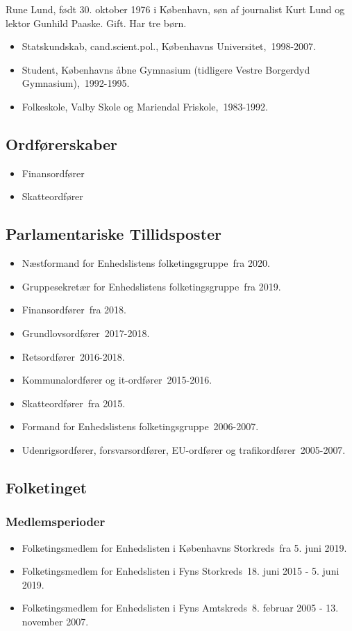 \documentclass[11pt, a4paper]{awesome-cv}
\begin{document}
\makecvheader[R]
\makelettertitle
\begin{cvletter}
Rune Lund, født 30. oktober 1976 i København, søn af journalist Kurt Lund og lektor Gunhild Paaske. Gift. Har tre børn.

\begin{itemize}
\item Statskundskab, cand.scient.pol., Københavns Universitet, 1998-2007.
\item Student, Københavns åbne Gymnasium (tidligere Vestre Borgerdyd Gymnasium), 1992-1995.
\item Folkeskole, Valby Skole og Mariendal Friskole, 1983-1992.
\end{itemize}
\subsection*{Ordførerskaber}
\begin{itemize}
\item Finansordfører
\item Skatteordfører
\end{itemize}
\subsection*{Parlamentariske Tillidsposter}
\begin{itemize}
\item Næstformand for Enhedslistens folketingsgruppe fra 2020.
\item Gruppesekretær for Enhedslistens folketingsgruppe fra 2019.
\item Finansordfører fra 2018.
\item Grundlovsordfører 2017-2018.
\item Retsordfører 2016-2018.
\item Kommunalordfører og it-ordfører 2015-2016.
\item Skatteordfører fra 2015.
\item Formand for Enhedslistens folketingsgruppe 2006-2007.
\item Udenrigsordfører, forsvarsordfører, EU-ordfører og trafikordfører 2005-2007.
\end{itemize}
\subsection*{Folketinget}
\subsubsection*{Medlemsperioder}
\begin{itemize}
\item Folketingsmedlem for Enhedslisten i Københavns Storkreds fra 5. juni 2019.
\item Folketingsmedlem for Enhedslisten i Fyns Storkreds 18. juni 2015 - 5. juni 2019.
\item Folketingsmedlem for Enhedslisten i Fyns Amtskreds 8. februar 2005 - 13. november 2007.
\end{itemize}

\end{cvletter}
\end{document}
